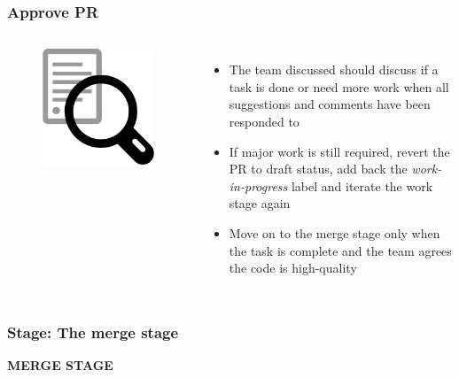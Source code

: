 \documentclass[aspectratio=169]{beamer} %
\begin{document}
\begin{frame}
	\frametitle{Approve PR}
	\begin{columns}[c]

		\begin{figure}
			\centering
			\includegraphics[width=.6\textwidth]{./img/qa.png}
		\end{figure}

		\begin{itemize}
			\setlength\itemsep{1em}
			\item The team discussed should discuss if a task is done 
			or need more work when all suggestions and comments
			have been responded to
			\item If major work is still required,
			revert the PR to draft status,
			add back the \textit{work-in-progress} label and
			iterate the work stage again
			\item Move on to the merge stage 
			only when the task is complete and 
			the team agrees the code is high-quality
		\end{itemize}

	\end{columns}
\end{frame}


\begin{frame}
	\frametitle{Stage: The merge stage}

	\huge\centering \textbf{MERGE STAGE}

\end{frame}
\end{document}
